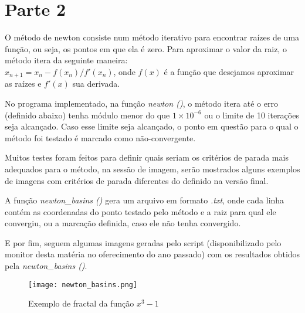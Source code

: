 \documentclass{article}
\begin{document}
\section*{Parte 2}
O método de newton consiste num método iterativo para encontrar raízes de uma função, ou seja,
os pontos em que ela é zero. Para aproximar o valor da raiz, o método itera da seguinte maneira: \\
$x_{n+1} = x_{n} - f(x_{n})/f'(x_{n})$, onde $f(x)$ é a função que desejamos aproximar as
raízes e $f'(x)$ sua derivada.

No programa implementado, na função \textit{newton ()}, o método itera até o erro (definido abaixo) 
tenha módulo menor do que $1 \times 10^{-6}$ ou o limite de 10 iterações seja alcançado. Caso esse limite seja alcançado,
o ponto em questão para o qual o método foi testado é marcado como não-convergente.

Muitos testes foram feitos para definir quais seriam os critérios de parada mais adequados para o método,
na sessão de imagem, serão mostrados alguns exemplos de imagens com critérios de parada diferentes do definido na versão final. 

A função \textit{newton\_basins ()} gera um arquivo em formato \textit{.txt}, onde cada linha contém as coordenadas 
do ponto testado pelo método e a raiz para qual ele convergiu, ou a marcação definida, caso ele não tenha
convergido.


E por fim, seguem algumas imagens geradas pelo script (disponibilizado pelo
monitor desta matéria no oferecimento do ano passado) com os resultados obtidos
pela \textit{newton\_basins ()}.


\begin{figure}[h]
\caption{Exemplo de fractal da função $x^{3} - 1$}
\centering
\texttt{[image: newton\_basins.png]}
\end{figure}





\end{document}
